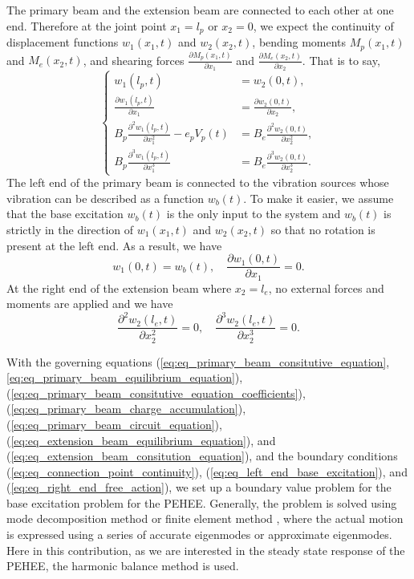 \documentclass{elsarticle}
\begin{document}
The primary beam and the extension beam are connected to each other at one end. Therefore at the joint point $x_1 = l_p$ or $x_2 = 0$, we expect the continuity of displacement functions $w_1(x_1,t)$ and $w_2(x_2,t)$, bending moments $M_p(x_1,t)$ and $M_e(x_2,t)$, and shearing forces $\frac{\partial M_p(x_1,t)}{\partial x_1}$ and $\frac{\partial M_e(x_2,t)}{\partial x_2}$. That is to say, 
\begin{equation}
    \left\{\begin{aligned}
        w_1(l_p,t) &= w_2(0,t), \\
        \frac{\partial w_1(l_p,t)}{\partial x_1} &= \frac{\partial w_2(0,t)}{\partial x_2}, \\
        B_p \frac{\partial^2 w_1(l_p,t)}{\partial x_1^2} - e_p V_p(t) &= B_e \frac{\partial^2 w_2(0,t)}{\partial x_2^2}, \\
        B_p \frac{\partial^3 w_1(l_p,t)}{\partial x_1^3} &= B_e \frac{\partial^3 w_2(0,t)}{\partial x_2^3}.
    \end{aligned}\right.
    \label{eq:eq_connection_point_continuity}
\end{equation}
The left end of the primary beam is connected to the vibration sources whose vibration can be described as a function $w_b(t)$. To make it easier, we assume that the base excitation $w_b(t)$ is the only input to the system and $w_b(t)$ is strictly in the direction of $w_1(x_1,t)$ and $w_2(x_2,t)$ so that no rotation is present at the left end. As a result, we have 
\begin{equation}
    w_1(0,t) = w_b(t), \quad \frac{\partial w_1(0,t)}{\partial x_1} = 0.
    \label{eq:eq_left_end_base_excitation}
\end{equation}
At the right end of the extension beam where $x_2 = l_e$, no external forces and moments are applied and we have
\begin{equation}
    \frac{\partial^2 w_2(l_e,t)}{\partial x_2^2} = 0, \quad \frac{\partial^3 w_2(l_e,t)}{\partial x_2^3} = 0.
    \label{eq:eq_right_end_free_action}
\end{equation}

With the governing equations (\ref{eq:eq_primary_beam_consitutive_equation},\ref{eq:eq_primary_beam_equilibrium_equation}), (\ref{eq:eq_primary_beam_consitutive_equation_coefficients}), (\ref{eq:eq_primary_beam_charge_accumulation}), (\ref{eq:eq_primary_beam_circuit_equation}), (\ref{eq:eq_extension_beam_equilibrium_equation}), and (\ref{eq:eq_extension_beam_consitution_equation}), and the boundary conditions (\ref{eq:eq_connection_point_continuity}), (\ref{eq:eq_left_end_base_excitation}), and (\ref{eq:eq_right_end_free_action}), we set up a boundary value problem for the base excitation problem for the PEHEE. Generally, the problem is solved using mode decomposition method \cite{erturk2009experimentally} or finite element method \cite{maurini2006numerical}, where the actual motion is expressed using a series of accurate eigenmodes or approximate eigenmodes. Here in this contribution, as we are interested in the steady state response of the PEHEE, the harmonic balance method \cite{wu1992generalized} is used. 
\end{document}
